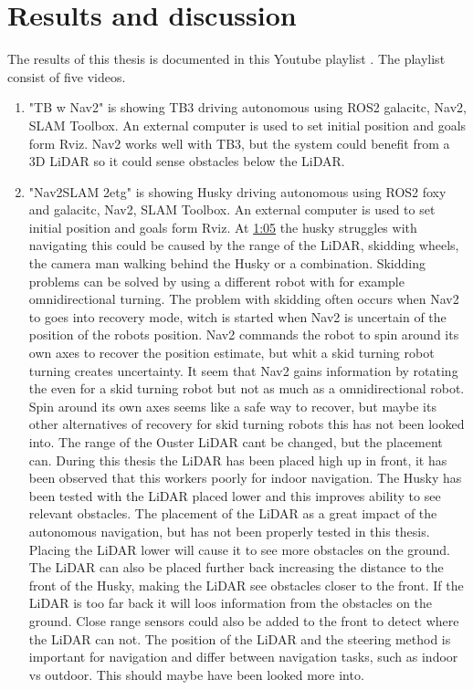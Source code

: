 \chapter{Results and discussion}

The results of this thesis is documented in this Youtube playlist \cite{youtube_playlist_results}. The playlist consist of five videos. 
\begin{enumerate}
    \item "TB w Nav2" is showing TB3 driving autonomous using ROS2 galacitc, Nav2, SLAM Toolbox. An external computer is used to set initial position and goals form Rviz. Nav2 works well with TB3, but the system could benefit from a 3D LiDAR so it could sense obstacles below the LiDAR. 
    

    \item "Nav2SLAM 2etg" \label{Nav2SLAM 2etg} is showing Husky driving autonomous using ROS2 foxy and galacitc, Nav2, SLAM Toolbox. An external computer is used to set initial position and goals form Rviz. 
    At \href{https://youtu.be/JiTbKtXq_GY?t=65}{1:05} the husky struggles with navigating this could be caused by the range of the LiDAR, skidding wheels, the camera man walking behind the Husky or a combination. 
    Skidding problems can be solved by using a different robot with for example omnidirectional turning.     The problem with skidding often occurs when Nav2 to goes into recovery mode, witch is started when Nav2 is uncertain of the position of the robots position. Nav2 commands the robot to spin around its own axes to recover the position estimate, but whit a skid turning robot turning creates uncertainty. It seem that Nav2 gains information by rotating the even for a skid turning robot but not as much as a omnidirectional robot. Spin around its own axes seems like a safe way to recover, but maybe its other alternatives of recovery for skid turning robots this has not been looked into. 
    The range of the Ouster LiDAR cant be changed, but the placement can. During this thesis the LiDAR has been placed high up in front, it has been observed that this workers poorly for indoor navigation. The Husky has been tested with the LiDAR placed lower and this improves ability to see relevant obstacles. The placement of the LiDAR as a great impact of the autonomous navigation, but has not been properly tested in this thesis. Placing the LiDAR lower will cause it to see more obstacles on the ground. The LiDAR can also be placed further back increasing the distance to the front of the Husky, making the LiDAR see obstacles closer to the front. If the LiDAR is too far back it will loos information from the obstacles on the ground. Close range sensors could also be added to the front to detect where the LiDAR can not. 
    The position of the LiDAR and the steering method is important for navigation and differ between navigation tasks, such as indoor vs outdoor. This should maybe have been looked more into.


\end{enumerate}
